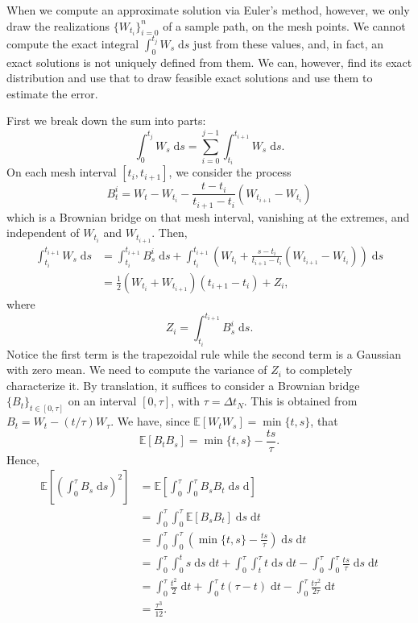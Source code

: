 \documentclass[reqno,12pt]{amsart}
\theoremstyle{plain}%
\theoremstyle{definition}
\begin{document}
When we compute an approximate solution via Euler's method, however, we only draw the realizations $\{W_{t_i}\}_{i=0}^n$ of a sample path, on the mesh points. We cannot compute the exact integral $\int_0^{t_j} W_s\;\mathrm{d}s$ just from these values, and, in fact, an exact solutions is not uniquely defined from them. We can, however, find its exact distribution and use that to draw feasible exact solutions and use them to estimate the error.

First we break down the sum into parts:
\begin{equation}
    \int_0^{t_j} W_s\;\mathrm{d}s = \sum_{i = 0}^{j-1} \int_{t_i}^{t_{i+1}} W_s\;\mathrm{d}s.
\end{equation}
On each mesh interval $[t_i, t_{i+1}]$, we consider the process
\begin{equation}
    B_t^i = W_t - W_{t_i} - \frac{t - t_i}{t_{i+1}-t_i}(W_{t_{i+1}} - W_{t_i})
\end{equation}
which is a Brownian bridge on that mesh interval, vanishing at the extremes, and  independent of $W_{t_i}$ and $W_{t_{i+1}}$. Then,
\begin{align*}
    \int_{t_i}^{t_{i+1}} W_s\;\mathrm{d}s & = \int_{t_i}^{t_{i+1}} B_s^i\;\mathrm{d}s + \int_{t_i}^{t_{i+1}} \left( W_{t_i} + \frac{s - t_i}{t_{i+1}-t_i}(W_{t_{i+1}} - W_{t_i})\right)\;\mathrm{d}s \\
    & = \frac{1}{2}\left(W_{t_i} + W_{t_{i+1}}\right)(t_{i+1} - t_i) + Z_i,
\end{align*}
where
\begin{equation}
    Z_i = \int_{t_i}^{t_{i+1}} B_s^i\;\mathrm{d}s.
\end{equation}
Notice the first term is the trapezoidal rule while the second term is a Gaussian with zero mean. We need to compute the variance of $Z_i$ to completely characterize it. By translation, it suffices to consider a Brownian bridge $\{B_t\}_{t\in [0, \tau]}$ on an interval $[0, \tau]$, with $\tau = \Delta t_N$. This is obtained from $B_t = W_t - (t/\tau)W_\tau$. We have, since $\mathbb{E}[W_tW_s] = \min\{t, s\}$, that
\[
    \mathbb{E}[B_tB_s] = \min\{t, s\} - \frac{ts}{\tau}.
\]
Hence,
\begin{align*}
    \mathbb{E}\left[\left(\int_0^{\tau} B_s\;\mathrm{d}s\right)^2\right] & = \mathbb{E}\left[\int_0^{\tau} \int_0^\tau B_sB_t\;\mathrm{d}s\;\mathrm{d}\right] \\
    & = \int_0^\tau \int_0^\tau \mathbb{E}[B_sB_t] \;\mathrm{d}s\;\mathrm{d}t \\
    & = \int_0^\tau \int_0^\tau \left(\min\{t, s\} - \frac{ts}{\tau}\right) \;\mathrm{d}s\;\mathrm{d}t \\
    & = \int_0^\tau \int_0^t s\;\mathrm{d}s\;\mathrm{d}t + \int_0^\tau \int_t^\tau t\;\mathrm{d}s\;\mathrm{d}t - \int_0^\tau \int_0^\tau \frac{ts}{\tau} \;\mathrm{d}s\;\mathrm{d}t \\
    & = \int_0^\tau \frac{t^2}{2}\;\mathrm{d}t + \int_0^\tau t(\tau - t)\;\mathrm{d}t - \int_0^\tau \frac{t\tau^2}{2\tau}\;\mathrm{d}t \\
    & = \frac{\tau^3}{12}.
\end{align*}
\end{document}
